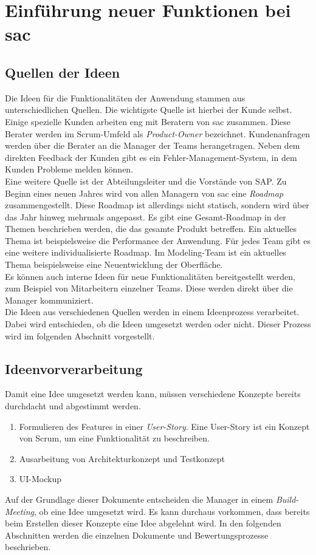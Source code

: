\section{Einführung neuer Funktionen bei \ac{sac}}\label{sec:feature}

\subsection{Quellen der Ideen}
Die Ideen für die Funktionalitäten der Anwendung stammen aus unterschiedlichen Quellen. Die wichtigste Quelle ist hierbei der Kunde selbst. 
Einige spezielle Kunden arbeiten eng mit Beratern von \ac{sac} zusammen. Diese Berater werden im Scrum-Umfeld als \textit{Product-Owner} bezeichnet. 
Kundenanfragen werden über die Berater an die Manager der Teams herangetragen. Neben dem direkten Feedback der Kunden gibt es ein 
Fehler-Management-System, in dem Kunden Probleme melden können.\\
Eine weitere Quelle ist der Abteilungsleiter und die Vorstände von SAP. Zu Beginn eines neuen Jahres wird von allen Managern von \ac{sac}
eine \textit{Roadmap} zusammengestellt. Diese Roadmap ist allerdings nicht statisch, sondern wird über das Jahr hinweg mehrmals angepasst. 
Es gibt eine Gesamt-Roadmap in der Themen beschrieben werden, die das gesamte Produkt betreffen. Ein aktuelles Thema ist beispielsweise
die Performance der Anwendung. Für jedes Team gibt es eine weitere individualisierte Roadmap. Im Modeling-Team ist ein aktuelles Thema beispielsweise 
eine Neuentwicklung der Oberfläche.\\
Es können auch interne Ideen für neue Funktionalitäten bereitgestellt werden, zum Beispiel von Mitarbeitern einzelner Teams.
Diese werden direkt über die Manager kommuniziert.\\
Die Ideen aus verschiedenen Quellen werden in einem Ideenprozess verarbeitet. Dabei wird entschieden, ob die Ideen umgesetzt werden oder nicht. Dieser Prozess
wird im folgenden Abschnitt vorgestellt.

\subsection{Ideenvorverarbeitung}
Damit eine Idee umgesetzt werden kann, müssen verschiedene Konzepte bereits durchdacht und abgestimmt werden. 
\begin{enumerate}
    \item Formulieren des Features in einer \textit{User-Story}. Eine User-Story ist ein Konzept von Scrum, um 
    eine Funktionalität zu beschreiben.
    \item Ausarbeitung von Architekturkonzept und Testkonzept
    \item UI-Mockup
\end{enumerate}
Auf der Grundlage dieser Dokumente entscheiden die Manager in einem \textit{Build-Meeting}, ob eine Idee 
umgesetzt wird. Es kann durchaus vorkommen, dass bereits beim Erstellen dieser Konzepte eine Idee abgelehnt wird. In den folgenden Abschnitten werden
die einzelnen Dokumente und Bewertungsprozesse beschrieben.

